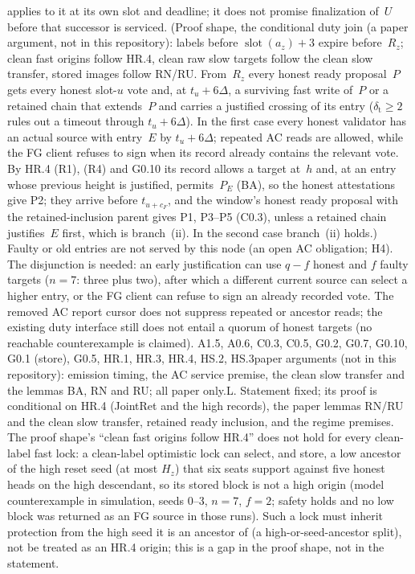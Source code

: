 \documentclass{article}
\newcommand{\slot}{\operatorname{slot}}
\newcommand{\cF}{c_F}
\begin{document}
{applies to it at its own slot and deadline; it does not promise finalization
of~$U$ before that successor is serviced.  (Proof shape, the conditional duty join (a paper argument, not in this
repository): labels before $\slot(a_z)+3$
expire before~$R_z$; clean fast origins follow HR.4, clean raw slow targets
follow the clean slow transfer, stored images follow RN/RU.  From~$R_z$ every honest
ready proposal~$P$ gets every honest slot-$u$ vote and, at $t_u+6\Delta$, a
surviving fast write of~$P$ or a retained chain that extends~$P$ and carries a
justified crossing of its entry ($\delta_{\mathrm t}\geq2$ rules out a timeout
through $t_u+6\Delta$).  In the first case every honest validator has an actual
source with entry~$E$ by $t_u+6\Delta$; repeated AC reads are allowed, while
the FG client refuses to sign when its record already contains the relevant vote.
By HR.4 (R1), (R4) and G0.10 its record allows a target at~$h$ and, at an
entry whose previous height is justified, permits~$P_E$ (BA), so the honest attestations give P2; they arrive before
$t_{u+\cF}$, and the window's honest ready proposal with the retained-inclusion
parent gives P1, P3--P5 (C0.3), unless a retained chain justifies~$E$ first,
which is branch~(ii).  In the second case branch~(ii) holds.)  Faulty or old entries are not
served by this node (an open AC obligation; H4).  The disjunction is
needed: an early justification can use $q-f$ honest and $f$ faulty targets
($n=7$: three plus two), after which a different current source can select a
higher entry, or the FG client can refuse to sign an already recorded vote.
The removed AC report cursor does not suppress repeated or ancestor reads;
the existing duty interface still does not
entail a quorum of honest targets (no reachable
counterexample is claimed).}
{A1.5, A0.6, C0.3, C0.5, G0.2, G0.7, G0.10, G0.1 (store), G0.5, HR.1,
HR.3, HR.4, HS.2, HS.3}{paper arguments (not in this repository): emission
timing, the AC service premise, the clean slow transfer and the lemmas BA, RN
and RU; all paper only.}{L.  Statement fixed; its proof is conditional on HR.4
(JointRet and the high records), the paper lemmas RN/RU and the clean slow
transfer, retained
ready inclusion, and the regime premises.  The proof shape's ``clean fast
origins follow HR.4'' does not hold for every clean-label fast lock: a
clean-label optimistic lock can select, and store, a low ancestor of the high
reset seed (at most $H_z$) that six seats support against five honest heads on
the high descendant, so its stored block is not a high origin (model
counterexample in simulation, seeds 0--3, $n=7$, $f=2$; safety holds and
no low block was returned as an FG source in those runs).  Such a lock must
inherit protection from the high seed it is an ancestor of (a high-or-seed-ancestor
split), not be treated as an HR.4 origin; this is a gap in the proof shape, not
in the statement.}
\end{document}
